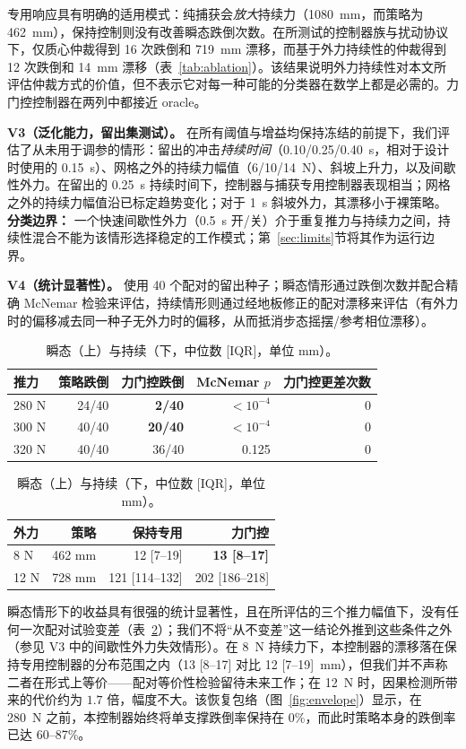 \documentclass[journal]{IEEEtran}
\begin{document}
专用响应具有明确的适用模式：纯捕获会\emph{放大}持续力（1080~mm，而策略为 462~mm），保持控制则没有改善瞬态跌倒次数。在所测试的控制器族与扰动协议下，仅质心仲裁得到 16 次跌倒和 719~mm 漂移，而基于外力持续性的仲裁得到 12 次跌倒和 14~mm 漂移（表~\ref{tab:ablation}）。该结果说明外力持续性对本文所评估仲裁方式的价值，但不表示它对每一种可能的分类器在数学上都是必需的。力门控控制器在两列中都接近 oracle。

\textbf{V3（泛化能力，留出集测试）。} 在所有阈值与增益均保持冻结的前提下，我们评估了从未用于调参的情形：留出的冲击\emph{持续时间}（0.10/0.25/0.40~s，相对于设计时使用的 0.15~s）、网格之外的持续力幅值（6/10/14~N）、斜坡上升力，以及间歇性外力。在留出的 0.25~s 持续时间下，控制器与捕获专用控制器表现相当；网格之外的持续力幅值沿已标定趋势变化；对于 1~s 斜坡外力，其漂移小于裸策略。\textbf{分类边界：} 一个快速间歇性外力（0.5~s 开/关）介于重复推力与持续力之间，持续性混合不能为该情形选择稳定的工作模式；第~\ref{sec:limits}节将其作为运行边界。

\textbf{V4（统计显著性）。} 使用 40 个配对的留出种子；瞬态情形通过跌倒次数并配合精确 McNemar 检验来评估，持续情形则通过经地板修正的配对漂移来评估（有外力时的偏移减去同一种子无外力时的偏移，从而抵消步态摇摆/参考相位漂移）。

\begin{table}[t]
\caption{瞬态（上）与持续（下，中位数 [IQR]，单位 mm）。}
\label{tab:stats}
\centering
\setlength{\tabcolsep}{4pt}
\begin{tabular}{lrrrr}
\hline
推力 & 策略跌倒 & 力门控跌倒 & McNemar $p$ & 力门控更差次数\\
\hline
280 N & 24/40 & \textbf{2/40} & $<10^{-4}$ & 0\\
300 N & 40/40 & \textbf{20/40} & $<10^{-4}$ & 0\\
320 N & 40/40 & 36/40 & 0.125 & 0\\
\hline
\end{tabular}

\vspace{4pt}

\begin{tabular}{lrrr}
\hline
外力 & 策略 & 保持专用 & 力门控\\
\hline
8 N & 462 mm & 12 [7--19] & \textbf{13 [8--17]}\\
12 N & 728 mm & 121 [114--132] & 202 [186--218]\\
\hline
\end{tabular}
\end{table}

瞬态情形下的收益具有很强的统计显著性，且在所评估的三个推力幅值下，没有任何一次配对试验变差（表~\ref{tab:stats}）；我们不将“从不变差”这一结论外推到这些条件之外（参见 V3 中的间歇性外力失效情形）。在 8~N 持续力下，本控制器的漂移落在保持专用控制器的分布范围之内（13 [8–17] 对比 12 [7–19]~mm），但我们并不声称二者在形式上等价——配对等价性检验留待未来工作；在 12~N 时，因果检测所带来的代价约为 $1.7$ 倍，幅度不大。该恢复包络（图~\ref{fig:envelope}）显示，在 280~N 之前，本控制器始终将单支撑跌倒率保持在 0\%，而此时策略本身的跌倒率已达 60–87\%。
\end{document}
